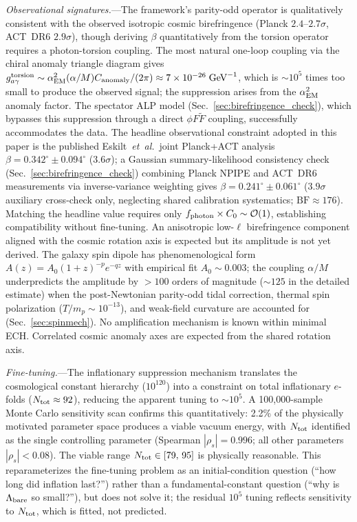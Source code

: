 \documentclass[aps,prd,twocolumn,superscriptaddress,showpacs,preprintnumbers,nofootinbib,longbibliography,floatfix]{revtex4-2}
\newcommand{\etal}{\textit{et~al.}}
\begin{document}
\textit{Observational signatures.}---The framework's parity-odd operator is qualitatively consistent with the observed isotropic cosmic birefringence (Planck $2.4$--$2.7\sigma$, ACT~DR6 $2.9\sigma$), though deriving $\beta$ quantitatively from the torsion operator requires a photon-torsion coupling. The most natural one-loop coupling via the chiral anomaly triangle diagram gives $g_{a\gamma}^{\rm torsion} \sim \alpha_{\rm EM}^2 (\alpha/M) C_{\rm anomaly} / (2\pi) \approx 7 \times 10^{-26}\;\text{GeV}^{-1}$, which is $\sim 10^5$ times too small to produce the observed signal; the suppression arises from the $\alpha_{\rm EM}^2$ anomaly factor. The spectator ALP model (Sec.~\ref{sec:birefringence_check}), which bypasses this suppression through a direct $\phi F\tilde{F}$ coupling, successfully accommodates the data. The headline observational constraint adopted in this paper is the published Eskilt~\etal\ joint Planck+ACT analysis $\beta = 0.342^\circ \pm 0.094^\circ$ ($3.6\sigma$); a Gaussian summary-likelihood consistency check (Sec.~\ref{sec:birefringence_check}) combining Planck NPIPE and ACT~DR6 measurements via inverse-variance weighting gives $\beta = 0.241^\circ \pm 0.061^\circ$ ($3.9\sigma$ auxiliary cross-check only, neglecting shared calibration systematics; $\mathrm{BF} \approx 176$). Matching the headline value requires only $f_{\rm photon} \times C_0 \sim \mathcal{O}(1)$, establishing compatibility without fine-tuning. An anisotropic low-$\ell$ birefringence component aligned with the cosmic rotation axis is expected but its amplitude is not yet derived. The galaxy spin dipole has phenomenological form $A(z)=A_0(1+z)^{-p}e^{-qz}$ with empirical fit $A_0 \sim 0.003$; the coupling $\alpha/M$ underpredicts the amplitude by ${>}100$ orders of magnitude (${\sim}125$ in the detailed estimate) when the post-Newtonian parity-odd tidal correction, thermal spin polarization ($T/m_p \sim 10^{-13}$), and weak-field curvature are accounted for (Sec.~\ref{sec:spinmech}). No amplification mechanism is known within minimal ECH. Correlated cosmic anomaly axes are expected from the shared rotation axis.

\textit{Fine-tuning.}---The inflationary suppression mechanism translates the cosmological constant hierarchy ($10^{120}$) into a constraint on total inflationary $e$-folds ($N_{\rm tot}\approx 92$), reducing the apparent tuning to $\sim 10^5$. A 100{,}000-sample Monte Carlo sensitivity scan confirms this quantitatively: 2.2\% of the physically motivated parameter space produces a viable vacuum energy, with $N_{\rm tot}$ identified as the single controlling parameter (Spearman $|\rho_s| = 0.996$; all other parameters $|\rho_s| < 0.08$). The viable range $N_{\rm tot} \in [79,\,95]$ is physically reasonable. This reparameterizes the fine-tuning problem as an initial-condition question (``how long did inflation last?'') rather than a fundamental-constant question (``why is $\Lambda_{\rm bare}$ so small?''), but does not solve it; the residual $10^5$ tuning reflects sensitivity to $N_{\rm tot}$, which is fitted, not predicted.
\end{document}
